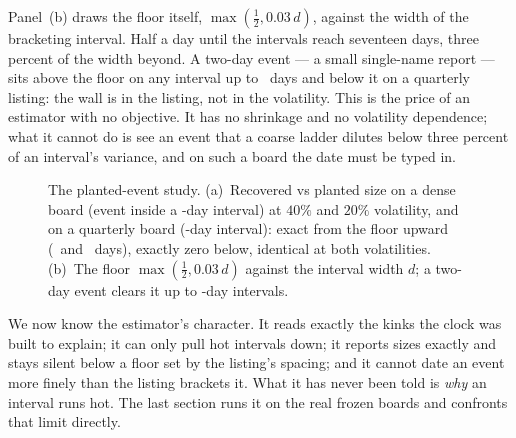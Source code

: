 Panel~(b) draws the floor itself, $\max(\tfrac12,0.03\,d)$, against
the width of the bracketing interval.  Half a day until the intervals
reach seventeen days, three percent of the width beyond.  A two-day
event --- a small single-name report --- sits above the floor on any
interval up to \MacClkIdentWallWidthD\ days and below it on a
quarterly listing: the wall is in the listing, not in the volatility.
This is the price of an estimator with no objective.  It has no
shrinkage and no volatility dependence; what it cannot do is see an
event that a coarse ladder dilutes below three percent of an
interval's variance, and on such a board the date must be typed in.

\begin{figure}[htbp]
\centering
{}
\caption{The planted-event study.  (a)~Recovered vs planted size on
a dense board (event inside a \MacClkIdentDenseWidthD-day interval)
at $40\%$ and $20\%$ volatility, and on a quarterly board
(\MacClkIdentQuartWidthD-day interval): exact from the floor upward
(\MacClkIdentFloorDenseD\ and \MacClkIdentFloorQuartD\ days), exactly
zero below, identical at both volatilities.  (b)~The floor
$\max(\tfrac12,0.03\,d)$ against the interval width $d$; a two-day
event clears it up to \MacClkIdentWallWidthD-day intervals.}
\label{fig:clkident}
\end{figure}

We now know the estimator's character.  It reads exactly the kinks
the clock was built to explain; it can only pull hot intervals down;
it reports sizes exactly and stays silent below a floor set by the
listing's spacing; and it cannot date an
event more finely than the listing brackets it.  What it has never
been told is \emph{why} an interval runs hot.  The last section runs
it on the real frozen boards and confronts that limit directly.
